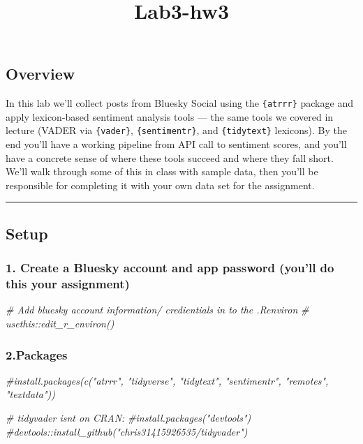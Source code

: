 \documentclass[
]{article}
\title{Lab3-hw3}
\author{}
\date{\vspace{-2.5em}}
\newenvironment{Shaded}{\begin{snugshade}}{\end{snugshade}}
\newcommand{\CommentTok}[1]{\textcolor[rgb]{0.56,0.35,0.01}{\textit{#1}}}
\begin{document}
\maketitle

\subsection{Overview}\label{overview}

In this lab we'll collect posts from Bluesky Social using the
\texttt{\{atrrr\}} package and apply lexicon-based sentiment analysis
tools --- the same tools we covered in lecture (VADER via
\texttt{\{vader\}}, \texttt{\{sentimentr\}}, and \texttt{\{tidytext\}}
lexicons). By the end you'll have a working pipeline from API call to
sentiment scores, and you'll have a concrete sense of where these tools
succeed and where they fall short. We'll walk through some of this in
class with sample data, then you'll be responsible for completing it
with your own data set for the assignment.

\begin{center}\rule{0.5\linewidth}{0.5pt}\end{center}

\subsection{Setup}\label{setup}

\subsubsection{1. Create a Bluesky account and app password (you'll do
this your
assignment)}\label{create-a-bluesky-account-and-app-password-youll-do-this-your-assignment}

\begin{Shaded}
\begin{Highlighting}[]
\CommentTok{\# Add bluesky account information/ credientials in to the \textasciigrave{}.Renviron\textasciigrave{}}
\CommentTok{\# usethis::edit\_r\_environ() }
\end{Highlighting}
\end{Shaded}

\subsubsection{2.Packages}\label{packages}

\begin{Shaded}
\begin{Highlighting}[]
\CommentTok{\#install.packages(c("atrrr", "tidyverse", "tidytext", "sentimentr", "remotes", "textdata"))}

\CommentTok{\# tidyvader isn\textquotesingle{}t on CRAN:}
\CommentTok{\#install.packages("devtools")}
\CommentTok{\#devtools::install\_github("chris31415926535/tidyvader")}
\end{Highlighting}
\end{Shaded}
\end{document}
